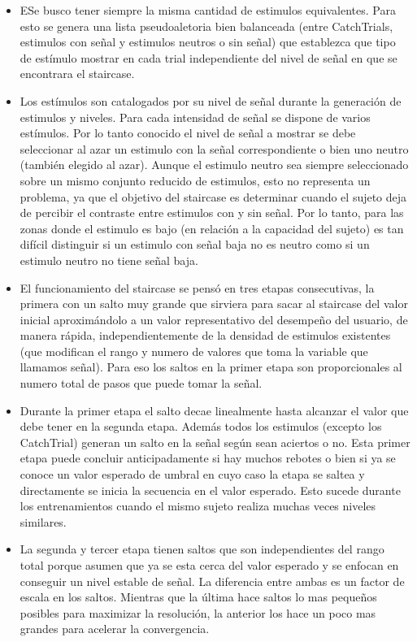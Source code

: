 \documentclass{article}
\begin{document}
    \begin{itemize}
        \item ESe busco tener siempre la misma cantidad de estimulos equivalentes. Para esto se genera una lista pseudoaletoria bien balanceada (entre CatchTrials, estimulos con señal y estimulos neutros o sin señal) que establezca que tipo de estímulo mostrar en cada trial independiente del nivel de señal en que se encontrara el staircase. 
        \item Los estímulos son catalogados por su nivel de señal durante la generación de estimulos y niveles. Para cada intensidad de señal se dispone de varios estímulos. Por lo tanto conocido el nivel de señal a mostrar se debe seleccionar al azar un estimulo con la señal correspondiente o bien uno neutro (también elegido al azar). Aunque el estimulo neutro sea siempre seleccionado sobre un mismo conjunto reducido de estimulos, esto no representa un problema, ya que el objetivo del staircase es determinar cuando el sujeto deja de percibir el contraste entre estimulos con y sin señal. Por lo tanto, para las zonas donde el estimulo es bajo (en relación a la capacidad del sujeto) es tan difícil distinguir si un estimulo con señal baja no es neutro como si un estimulo neutro no tiene señal baja.
        \item El funcionamiento del staircase se pensó en tres etapas consecutivas, la primera con un salto muy grande que sirviera para sacar al staircase del valor inicial aproximándolo a un valor representativo del desempeño del usuario, de manera rápida, independientemente de la densidad de estimulos existentes (que modifican el rango y numero de valores que toma la variable que llamamos señal). Para eso los saltos en la primer etapa son proporcionales al numero total de pasos que puede tomar la señal. 
        \item Durante la primer etapa el salto decae linealmente hasta alcanzar el valor que debe tener en la segunda etapa. Además todos los estimulos (excepto los CatchTrial) generan un salto en la señal según sean aciertos o no. Esta primer etapa puede concluir anticipadamente si hay muchos rebotes o bien si ya se conoce un valor esperado de umbral en cuyo caso la etapa se saltea y directamente se inicia la secuencia en el valor esperado. Esto sucede durante los entrenamientos cuando el mismo sujeto realiza muchas veces niveles similares. 
        \item La segunda y tercer etapa tienen saltos que son independientes del rango total porque asumen que ya se esta cerca del valor esperado y se enfocan en conseguir un nivel estable de señal. La diferencia entre ambas es un factor de escala en los saltos. Mientras que la última hace saltos lo mas pequeños posibles para maximizar la resolución, la anterior los hace un poco mas grandes para acelerar la convergencia. 

\end{itemize}
\end{document}
